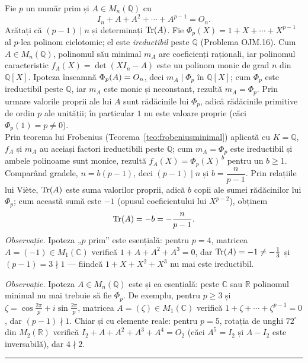 Fie $p$ un număr prim și $A\in M_n(\mathbb{Q})$ cu
\[ I_n+A+A^2+\cdots+A^{p-1}=O_n. \]
Arătați că $(p-1)\mid n$ și determinați $\operatorname{Tr}(A)$.
\sol Fie $\Phi_p(X)=1+X+\cdots+X^{p-1}$ al $p$-lea polinom ciclotomic; el este \emph{ireductibil} peste $\mathbb{Q}$ (Problema OJM.16). Cum $A\in M_n(\mathbb{Q})$, polinomul său minimal $m_A$ are coeficienți raționali, iar polinomul caracteristic $f_A(X)=\det(XI_n-A)$ este un polinom monic de grad $n$ din $\mathbb{Q}[X]$. Ipoteza înseamnă $\Phi_p(A)=O_n$, deci $m_A\mid\Phi_p$ în $\mathbb{Q}[X]$; cum $\Phi_p$ este ireductibil peste $\mathbb{Q}$, iar $m_A$ este monic și neconstant, rezultă $m_A=\Phi_p$. Prin urmare valorile proprii ale lui $A$ sunt rădăcinile lui $\Phi_p$, adică rădăcinile primitive de ordin $p$ ale unității; în particular $1$ nu este valoare proprie (căci $\Phi_p(1)=p\neq0$).\\[2pt]
Prin teorema lui Frobenius (Teorema~\ref{teo:frobeniusminimal}) aplicată cu $K=\mathbb{Q}$, $f_A$ și $m_A$ au aceiași factori ireductibili peste $\mathbb{Q}$; cum $m_A=\Phi_p$ este ireductibil și ambele polinoame sunt monice, rezultă $f_A(X)=\Phi_p(X)^{\,b}$ pentru un $b\ge1$. Comparând gradele, $n=b(p-1)$, deci $(p-1)\mid n$ și $b=\dfrac{n}{p-1}$. Prin relațiile lui Viète, $\operatorname{Tr}(A)$ este suma valorilor proprii, adică $b$ copii ale sumei rădăcinilor lui $\Phi_p$; cum această sumă este $-1$ (opusul coeficientului lui $X^{p-2}$), obținem
\[ \operatorname{Tr}(A)=-b=-\frac{n}{p-1}. \]
\emph{Observație.} Ipoteza „$p$ prim'' este esențială: pentru $p=4$, matricea $A=(-1)\in M_1(\mathbb{C})$ verifică $1+A+A^2+A^3=0$, dar $\operatorname{Tr}(A)=-1\neq-\tfrac13$ și $(p-1)=3\nmid1$ --- fiindcă $1+X+X^2+X^3$ nu mai este ireductibil.

\emph{Observație.} Ipoteza $A\in M_n(\mathbb{Q})$ este și ea esențială: peste $\mathbb{C}$ sau $\mathbb{R}$ polinomul minimal nu mai trebuie să fie $\Phi_p$. De exemplu, pentru $p\ge3$ și $\zeta=\cos\frac{2\pi}{p}+i\sin\frac{2\pi}{p}$, matricea $A=(\zeta)\in M_1(\mathbb{C})$ verifică $1+\zeta+\cdots+\zeta^{p-1}=0$, dar $(p-1)\nmid 1$. Chiar și cu elemente reale: pentru $p=5$, rotația de unghi $72^\circ$ din $M_2(\mathbb{R})$ verifică $I_2+A+A^2+A^3+A^4=O_2$ (căci $A^5=I_2$ și $A-I_2$ este inversabilă), dar $4\nmid 2$.

\vspace{1mm}\hrule

